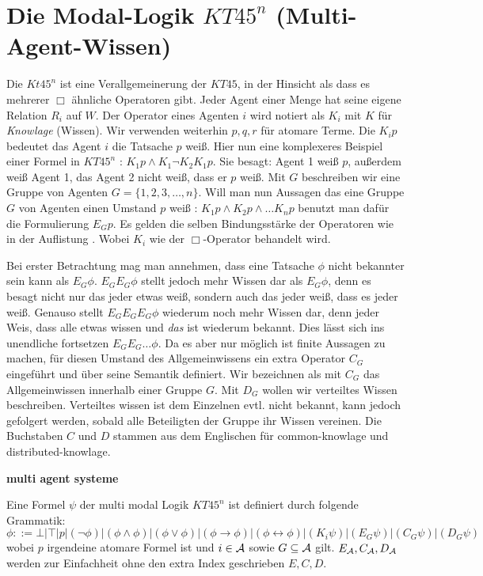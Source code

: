 
\section{Die Modal-Logik $KT45^n$ (Multi-Agent-Wissen)} %
\label{sub:the_modal_logic_kt45_n_}

Die \MML $Kt45^n$ ist eine Verallgemeinerung der \ML $KT45$, in der Hinsicht als dass es mehrerer $\Box$ ähnliche Operatoren gibt.
Jeder Agent einer Menge \AgentSetDef hat seine eigene Relation $R_i$ auf $W$.
Der Operator eines Agenten $i$ wird notiert als $K_i$ mit $K$ für \emph{Knowlage} (Wissen).
Wir verwenden weiterhin $p,q,r$ für atomare Terme.
Die $K_ip$ bedeutet das Agent $i$ die Tatsache $p$ weiß.
Hier nun eine komplexeres Beispiel einer Formel in $KT45^n$ : $K_1p \wedge K_1 \neg K_2 K_1 p$.
Sie besagt: Agent 1 weiß $p$, außerdem weiß Agent 1, das Agent 2 nicht weiß, dass er $p$ weiß.
Mit $G$ beschreiben wir eine Gruppe von Agenten $G= \{1,2,3,\dots,n\}$.
Will man nun Aussagen das eine Gruppe $G$ von Agenten einen Umstand $p$ weiß : $K_1 p \wedge K_2 p \wedge \dots K_n p$ benutzt man dafür die Formulierung $E_G p$.
Es gelden die selben Bindungsstärke der Operatoren wie in der Auflistung .
Wobei $K_i$ wie der $\Box$-Operator behandelt wird.


Bei erster Betrachtung mag man annehmen, dass eine Tatsache $\phi$ nicht bekannter sein kann als $E_G \phi$.
$E_G E_G \phi$ stellt jedoch mehr Wissen dar als $E_G \phi$, denn es besagt nicht nur das jeder etwas weiß, sondern auch das jeder weiß, dass es jeder weiß.
Genauso stellt $E_G E_G E_G \phi$ wiederum noch mehr Wissen dar, denn jeder Weis, dass alle etwas wissen und \emph{das} ist wiederum bekannt.
Dies lässt sich ins unendliche fortsetzen $E_G E_G \dots \phi$.
Da es aber nur möglich ist finite Aussagen zu machen, für diesen Umstand des Allgemeinwissens ein extra Operator $C_G$ eingeführt und über seine Semantik definiert.
Wir bezeichnen als mit $C_G$ das Allgemeinwissen innerhalb einer Gruppe $G$.
Mit $D_G$ wollen wir verteiltes Wissen beschreiben.
Verteiltes wissen ist dem Einzelnen evtl. nicht bekannt, kann jedoch gefolgert werden, sobald alle Beteiligten der Gruppe ihr Wissen vereinen.
Die Buchstaben $C$ und $D$ stammen aus dem Englischen für common-knowlage und distributed-knowlage.

\textbf{multi agent systeme}
\begin{definition}
	\label{def:bnf_kt45n}
	Eine Formel $\psi$ der multi modal Logik $KT45^n$ ist definiert durch folgende Grammatik:
	\begin{equation}
		\label{eqn:bnf_kt45n}
		\phi ::= \bot|\top|p|(\neg\phi)|(\phi\wedge\phi)|(\phi\vee\phi)|(\phi\rightarrow\phi)|
		(\phi\leftrightarrow\phi)|(K_i\psi)|(E_G\psi)|(C_G\psi)|(D_G\psi)
	\end{equation}
	wobei $p$ irgendeine atomare Formel ist und $i \in \mathcal{A}$ sowie $G \subseteq \mathcal{A}$ gilt.
	$E_{\mathcal{A}}, C_{\mathcal{A}}, D_{\mathcal{A}}$ werden zur Einfachheit ohne den extra Index geschrieben $E,C,D$.
\end{definition}



